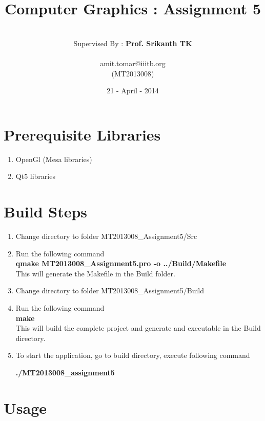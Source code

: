 \documentclass[11pt]{article}
\title{\textbf{Computer Graphics : Assignment 5}}
\author{
		\vspace{ 2 mm}\\
		Supervised By : \textbf{Prof. Srikanth TK}\\
		\vspace {2mm}\\
		amit.tomar@iiitb.org \\
		(MT2013008) \\
		}
\date{21 - April - 2014}
\begin{document}
\lstset{language=C} 
\maketitle

\vspace{ 100 mm}

\section{Prerequisite Libraries}

\begin {enumerate}
\item OpenGl (Mesa libraries)
\item Qt5 libraries
\end {enumerate}

\section{Build Steps}

\begin {enumerate}
\item Change directory to folder MT2013008\_Assignment5/Src
\item Run the following command\\

\textbf{qmake MT2013008\_Assignment5.pro -o ../Build/Makefile} \\

This will generate the Makefile in the Build folder.

\item Change directory to folder MT2013008\_Assignment5/Build

\item Run the following command \\

\textbf{make} \\

This will build the complete project and generate and executable in the Build directory.

\item To start the application, go to build directory, execute following command 

\textbf{./MT2013008\_assignment5}



\end {enumerate}

\section{Usage}
\end{document}
